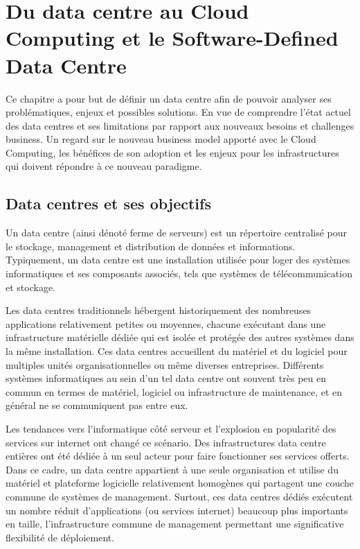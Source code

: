 
\chapter{Du data centre au Cloud Computing et le Software-Defined Data Centre}
\label{chap-1}

Ce chapitre a pour but de définir un data centre afin de pouvoir analyser ses problématiques, enjeux et possibles solutions. En vue de comprendre l'état actuel des data centres et ses limitations par rapport aux nouveaux besoins et challenges business. Un regard sur le nouveau business model apporté avec le Cloud Computing, les bénéfices de son adoption et les enjeux pour les infrastructures qui doivent répondre à ce nouveau paradigme.

\section{Data centres et ses objectifs}

Un data centre (ainsi dénoté ferme de serveurs) est un répertoire centralisé pour le stockage, management et distribution de données et informations. Typiquement, un data centre est une installation utilisée pour loger des systèmes informatiques et ses composants associés, tels que systèmes de télécommunication et stockage. \cite{understandingCloudWhatDC}

Les data centres traditionnels hébergent historiquement des nombreuses applications relativement petites ou moyennes, chacune exécutant dans une infrastructure matérielle dédiée qui est isolée et protégée des autres systèmes dans la même installation. Ces data centres accueillent du matériel et du logiciel pour multiples unités organisationnelles ou même diverses entreprises. Différents systèmes informatiques au sein d'un tel data centre ont souvent très peu en commun en termes de matériel, logiciel ou infrastructure de maintenance, et en général ne se communiquent pas entre eux. 


Les tendances vers l'informatique côté serveur et l'explosion en popularité des services sur internet ont changé ce scénario. Des infrastructures data centre entières ont été dédiée à un seul acteur pour faire fonctionner ses services offerts. Dans ce cadre, un data centre appartient à une seule organisation et utilise du matériel et plateforme logicielle relativement homogènes qui partagent une couche commune de systèmes de management. Surtout, ces data centres dédiés exécutent un nombre réduit d'applications (ou services internet) beaucoup plus importants en taille, l'infrastructure commune de management permettant une significative flexibilité de déploiement. 

